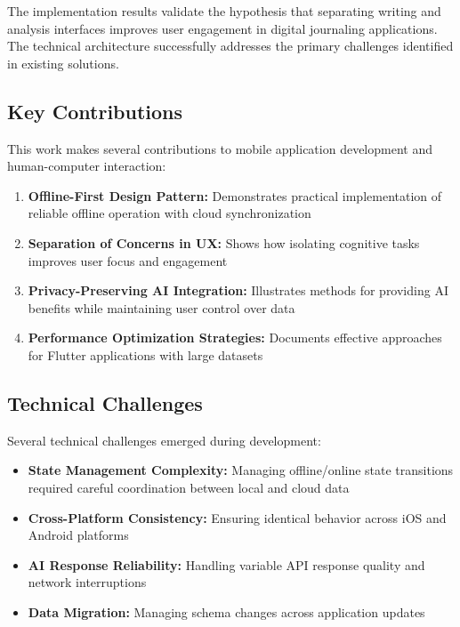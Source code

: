 \documentclass[conference]{IEEEtran}
\begin{document}
{\begin{IEEEkeywords}
The implementation results validate the hypothesis that separating writing and analysis interfaces improves user engagement in digital journaling applications. The technical architecture successfully addresses the primary challenges identified in existing solutions.

\subsection{Key Contributions}

This work makes several contributions to mobile application development and human-computer interaction:

\begin{enumerate}
\item \textbf{Offline-First Design Pattern:} Demonstrates practical implementation of reliable offline operation with cloud synchronization
\item \textbf{Separation of Concerns in UX:} Shows how isolating cognitive tasks improves user focus and engagement
\item \textbf{Privacy-Preserving AI Integration:} Illustrates methods for providing AI benefits while maintaining user control over data
\item \textbf{Performance Optimization Strategies:} Documents effective approaches for Flutter applications with large datasets
\end{enumerate}

\subsection{Technical Challenges}

Several technical challenges emerged during development:

\begin{itemize}
\item \textbf{State Management Complexity:} Managing offline/online state transitions required careful coordination between local and cloud data
\item \textbf{Cross-Platform Consistency:} Ensuring identical behavior across iOS and Android platforms
\item \textbf{AI Response Reliability:} Handling variable API response quality and network interruptions
\item \textbf{Data Migration:} Managing schema changes across application updates
\end{itemize}


\end{IEEEkeywords}}
\end{document}
